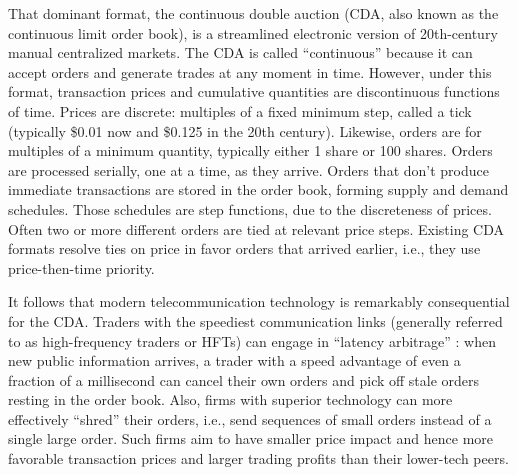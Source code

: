 \documentclass[12pt]{article}
\begin{document}
That dominant format, the continuous double auction (CDA, also known as the continuous limit order book), is a streamlined electronic version of 20th-century manual centralized markets. %
The CDA is called “continuous” because it can accept orders and generate trades at any moment in time. 
However, under this format, transaction prices and cumulative quantities are discontinuous functions of time. 
Prices are discrete: multiples of a fixed minimum step, called a tick (typically \$0.01 now  and \$0.125 in the 20th century). 
Likewise, orders are for multiples of a minimum quantity,
typically either 1 share or 100 shares. 
Orders are processed serially, one at a time, as they arrive. 
Orders that don't produce immediate transactions are stored in the order book, forming supply and demand schedules. 
Those schedules are step functions, due to the discreteness of prices. 
Often two or more different orders are tied at relevant price steps.
Existing CDA formats resolve ties on price in favor orders that arrived earlier, i.e., they use price-then-time priority. 

It follows that modern telecommunication technology is remarkably consequential for the CDA. Traders   
with the speediest communication links (generally referred to as  high-frequency traders or HFTs) can engage in ``latency arbitrage'' \citep{Budish2015,AquilinaBudishOneill2022}: 
when new public information arrives,
a trader with a speed advantage of even a fraction of a millisecond can cancel their own orders and pick off stale orders resting in the order book. 
Also, firms with superior technology can more effectively ``shred'' their orders, i.e., send sequences of small orders instead of a single large order.
Such firms aim to have smaller price impact and hence more favorable transaction prices and larger trading profits than their lower-tech peers. 
\end{document}
